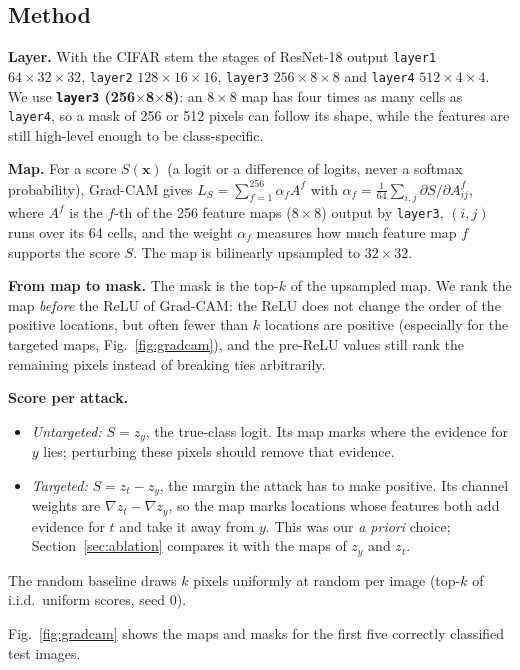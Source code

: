 \documentclass[10pt,a4paper]{article}
\newcommand{\x}{\mathbf{x}}
\begin{document}
\subsection{Method}

\textbf{Layer.} With the CIFAR stem the stages of ResNet-18 output
\texttt{layer1} $64\times32\times32$, \texttt{layer2} $128\times16\times16$,
\texttt{layer3} $256\times8\times8$ and \texttt{layer4} $512\times4\times4$. We use
\textbf{\texttt{layer3} (256$\times$8$\times$8)}: an $8\times8$ map has four times as
many cells as \texttt{layer4}, so a mask of 256 or 512 pixels can follow its shape,
while the features are still high-level enough to be class-specific.

\textbf{Map.} For a score $S(\x)$ (a logit or a difference of logits, never a
softmax probability), Grad-CAM gives
$L_S=\sum_{f=1}^{256}\alpha_f A^f$ with
$\alpha_f=\frac{1}{64}\sum_{i,j}\partial S/\partial A^f_{ij}$, where $A^f$ is the
$f$-th of the 256 feature maps ($8\times8$) output by \texttt{layer3}, $(i,j)$ runs
over its 64 cells, and the weight $\alpha_f$ measures how much feature map $f$
supports the score $S$. The map is bilinearly upsampled to $32\times32$.

\textbf{From map to mask.} The mask is the top-$k$ of the upsampled map. We rank the
map \emph{before} the ReLU of Grad-CAM: the ReLU does not change the order of the
positive locations, but often fewer than $k$ locations are positive (especially for
the targeted maps, Fig.~\ref{fig:gradcam}), and the pre-ReLU values still rank the
remaining pixels instead of breaking ties arbitrarily.

\textbf{Score per attack.}
\begin{itemize}
\item \emph{Untargeted:} $S=z_y$, the true-class logit. Its map marks where the
evidence for $y$ lies; perturbing these pixels should remove that evidence.
\item \emph{Targeted:} $S=z_t-z_y$, the margin the attack has to make positive. Its
channel weights are $\nabla z_t-\nabla z_y$, so the map marks locations whose
features both add evidence for $t$ and take it away from $y$. This was our
\emph{a priori} choice; Section~\ref{sec:ablation} compares it with the maps of $z_y$
and $z_t$.
\end{itemize}
The random baseline draws $k$ pixels uniformly at random per image (top-$k$ of
i.i.d.\ uniform scores, seed 0).

Fig.~\ref{fig:gradcam} shows the maps and masks for the first five correctly
classified test images.
\end{document}
